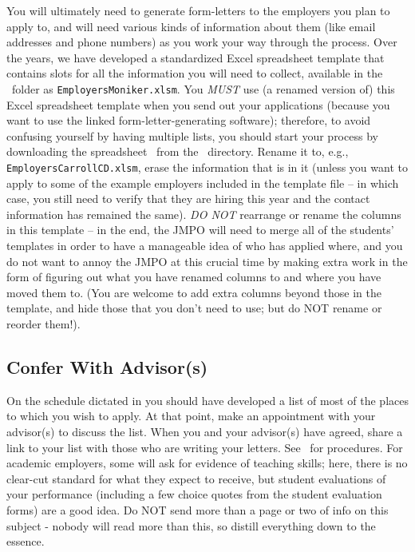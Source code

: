 \documentclass{\classes/econtex}
\begin{document}
You will ultimately need to generate form-letters to the employers you plan to apply to, and will need various kinds of information about them (like email addresses and phone numbers) as you work your way through the process.  Over the years, we have developed a standardized Excel spreadsheet template that contains slots for all the information you will need to collect, available in the \Templates~folder as \texttt{EmployersMoniker.xlsm}.  You \textit{MUST} use (a renamed version of) this Excel spreadsheet template when you send out your applications (because you want to use the linked form-letter-generating software); therefore, to avoid confusing yourself by having multiple lists, you should start your process by downloading the spreadsheet {\Employers}~from the \Templatesurl~directory.  Rename it to, e.g., \texttt{EmployersCarrollCD.xlsm}, erase the information that is in it (unless you want to apply to some of the example employers included in the template file -- in which case, you still need to verify that they are hiring this year and the contact information has remained the same).  \textit{DO NOT} rearrange or rename the columns in this template -- in the end, the JMPO will need to merge all of the students' templates in order to have a manageable idea of who has applied where, and you do not want to annoy the JMPO at this crucial time by making extra work in the form of figuring out what you have renamed columns to and where you have moved them to.  (You are welcome to add extra columns beyond those in the template, and hide those that you don't need to use; but do NOT rename or reorder them!).

\hypertarget{confer-with-advisors}{}
\subsection*{Confer With Advisor(s)}
On the schedule dictated in {\timet}  you should have developed a list of most of the places to which you wish to apply.  At that point, make an appointment with your advisor(s) to discuss the list.  When you and your advisor(s) have agreed, share a link to your list with those who are writing your letters.  See \recLet~for procedures. For academic employers, some will ask for evidence of teaching skills; here, there is no clear-cut standard for what they expect to receive, but student evaluations of your performance (including a few choice quotes from the student evaluation forms) are a good idea.  Do NOT send more than a page or two of info on this subject - nobody will read more than this, so distill everything down to the essence.
\end{document}
